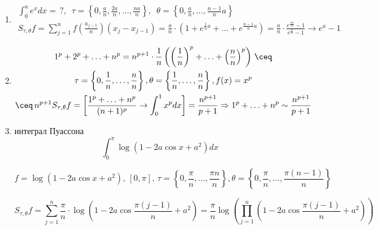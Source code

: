 \begin{example}
    \begin{enumerate}
    \item 
    \[
        \begin{gathered}
            \int_0^{a} e^x dx = \,? , \,\,\, \tau = \left\{ 0, \frac{a}{n}, \frac{2a}{n}, \ldots, \frac{na}{n} \right\}, \,\,\, \theta = \left\{ 0, \frac{a}{n}, \ldots , \frac{n - 1}{n} a \right\}\\
            S_{\tau, \theta} f = \sum_{j = 1}^n f \left( \frac{a_{j - 1}}{n} \right)(x_j - x_{j - 1}) 
            = \frac{a}{n} \cdot \left( 1 + e ^ {\frac{1}{n}a} + \ldots + e ^{\frac{n - 1}{n} a} \right) 
            = \frac{a}{n} \cdot \frac{e ^ {\frac{na}{n}} - 1}{e ^ {\frac{a}{n}} - 1} \to e^a - 1
        \end{gathered}
    \]
    \item
    \[
        \begin{gathered}
            1 ^ p + 2 ^ p + \ldots + n ^ p = n ^ {p + 1} \cdot \frac{1}{n} \left( \left( \frac{1}{n} \right) ^ p + \ldots + \left( \frac{n}{n} \right) ^ p \right) \, \ceq\\
            \tau = \left\{ 0, \frac{1}{n}, \ldots , \frac{n}{n} \right\}, \theta = \left\{\frac{1}{n}, \ldots , \frac{n}{n}  \right\}, f(x) = x ^ p\\
            \ceq \, n ^ {p + 1} S_{\tau, \theta} f = \left[\frac{1 ^ p + \ldots + n ^ p}{(n + 1) ^ p} \to \int_0^1 x ^ p dx\right]
            = \frac{n^{p + 1}}{p + 1} \Rightarrow 1 ^ p + \ldots + n ^ p \sim \frac{n ^ {p + 1}}{p + 1}
        \end{gathered}
    \]

    \item интеграл Пуассона
    \[
        \int_0^\pi \log{(1 - 2a \cos{x} + a ^ 2)} dx
    \]

    \[
        f = \log{(1 - 2a \cos{x} + a ^ 2)},\, [0, \pi],\, \tau = \left\{0, \frac{\pi}{n}, \ldots , \frac{\pi n}{n} \right\}, \theta = \left\{0, \frac{\pi}{n}, \ldots , \frac{\pi (n - 1)}{n} \right\}
    \]

    \[
        S_{\tau, \theta} f = \sum_{j = 1}^n \frac{\pi}{n} \cdot \log\left(1 - 2a \cos{\frac{\pi (j - 1)}{n} + a ^ 2}\right) = \frac{\pi}{n} \log\left(\prod_{j = 1}^n \left(1 - 2a \cos{\frac{\pi (j - 1)}{n} + a ^ 2}\right)\right)
    \]


\end{enumerate}
\end{example}
